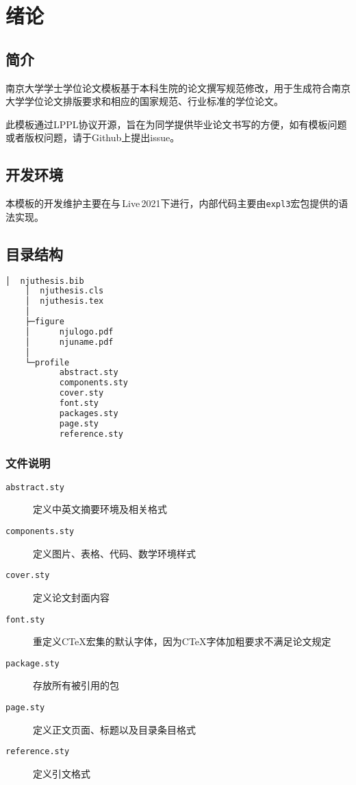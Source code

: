 \chapter{绪论}

\section{简介}
南京大学学士学位论文模板\cite{njuthesis}基于本科生院的论文撰写规范修改，用于生成符合南京大学学位论文排版要求和相应的国家规范、行业标准的学位论文。

此模板通过LPPL协议开源，旨在为同学提供毕业论文书写的方便，如有模板问题或者版权问题，请于Github上提出issue。

\section{开发环境}

本模板的开发维护主要在与\,Live\,2021下进行，内部代码主要由\lstinline|expl3|宏包提供的语法实现。

\section{目录结构}
\label{sec:directory}

\begin{lstlisting}[language=bash]
    │  njuthesis.bib
    │  njuthesis.cls
    │  njuthesis.tex
    │
    ├─figure
    │      njulogo.pdf
    │      njuname.pdf
    │
    └─profile
           abstract.sty
           components.sty
           cover.sty
           font.sty
           packages.sty
           page.sty
           reference.sty
\end{lstlisting}

\subsection{文件说明}
\begin{description}
    \item [\texttt{abstract.sty}] 定义中英文摘要环境及相关格式
    \item [\texttt{components.sty}] 定义图片、表格、代码、数学环境样式
    \item [\texttt{cover.sty}] 定义论文封面内容
    \item [\texttt{font.sty}] 重定义CTeX宏集的默认字体，因为CTeX字体加粗要求不满足论文规定
    \item [\texttt{package.sty}] 存放所有被引用的包
    \item [\texttt{page.sty}] 定义正文页面、标题以及目录条目格式
    \item [\texttt{reference.sty}] 定义引文格式
\end{description}

